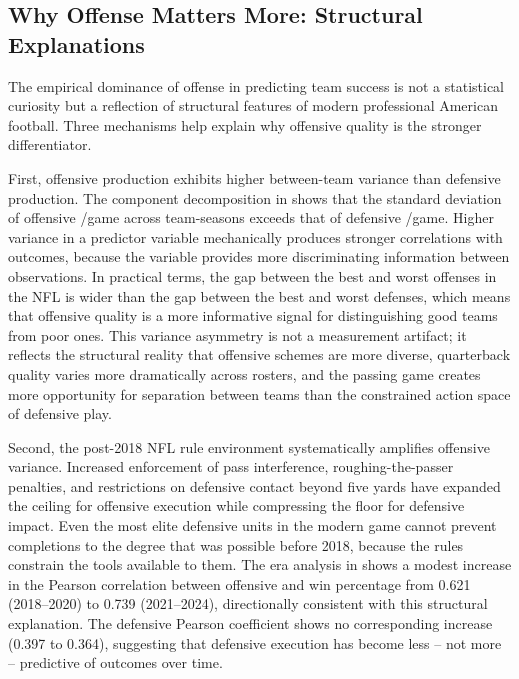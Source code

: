 \subsection{Why Offense Matters More: Structural Explanations}
\label{sec:structural-explanations}

The empirical dominance of offense in predicting team success is not a statistical
curiosity but a reflection of structural features of modern professional American
football. Three mechanisms help explain why offensive quality is the stronger
differentiator.

First, offensive production exhibits higher between-team variance than defensive
production. The component decomposition in  shows
that the standard deviation of offensive \xvoa{}/game across team-seasons exceeds
that of defensive \xvoa{}/game. Higher variance in a predictor variable
mechanically produces stronger correlations with outcomes, because the variable
provides more discriminating information between observations. In practical terms,
the gap between the best and worst offenses in the NFL is wider than the gap
between the best and worst defenses, which means that offensive quality is a
more informative signal for distinguishing good teams from poor ones. This
variance asymmetry is not a measurement artifact; it reflects the structural
reality that offensive schemes are more diverse, quarterback quality varies more
dramatically across rosters, and the passing game creates more opportunity for
separation between teams than the constrained action space of defensive play.

Second, the post-2018 NFL rule environment systematically amplifies offensive
variance. Increased enforcement of pass interference, roughing-the-passer
penalties, and restrictions on defensive contact beyond five yards \parencite{pereira2018roughing,barnwell2019passingrevolution} have expanded
the ceiling for offensive execution while compressing the floor for defensive
impact. Even the most elite defensive units in the modern game cannot prevent
completions to the degree that was possible before 2018, because the rules
constrain the tools available to them. The era analysis in 
shows a modest increase in the Pearson correlation between offensive \xvoa{} and
win percentage from 0.621 (2018--2020) to 0.739 (2021--2024), directionally
consistent with this structural explanation. The defensive Pearson coefficient
shows no corresponding increase (0.397 to 0.364), suggesting that defensive
execution has become less -- not more -- predictive of outcomes over time.

